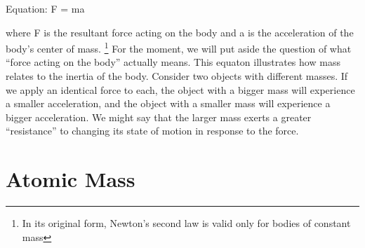 \documentclass{book}
\begin{document}
Equation: F = ma

where F is the resultant force acting on the body and a is the acceleration of the body's center of mass. \footnote{In its original form, Newton's second law is valid only for bodies of constant mass} For the moment, we will put aside the question of what ``force acting on the body'' actually means. This equaton illustrates how mass relates to the inertia of the body. Consider two objects with different masses. If we apply an identical force to each, the object with a bigger mass will experience a smaller acceleration, and the object with a smaller mass will experience a bigger acceleration. We might say that the larger mass exerts a greater ``resistance'' to changing its state of motion in response to the force.

\section{Atomic Mass}
\end{document}
